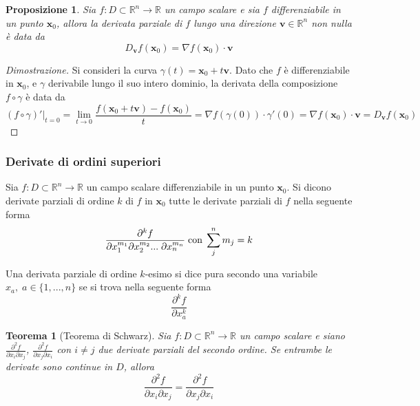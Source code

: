 \documentclass{article}
\newtheorem{theorem}{Teorema}
\newtheorem{proposition}{Proposizione}
\begin{document}
            \vspace{10pt}
            \begin{proposition}
                Sia $f: D \subset \mathbb{R}^{n} \rightarrow \mathbb{R}$ un campo scalare e sia $f$ differenziabile in un punto $\mathbf{x}_0$, allora la derivata parziale di $f$ lungo una direzione $\mathbf{v} \in \mathbb{R}^{n}$ non nulla è data da
                \[
                    D_{\mathbf{v}} f(\mathbf{x}_0) = \nabla f (\mathbf{x}_0) \cdot \mathbf{v}
                \]
            \end{proposition}
            \begin{proof}[Dimostrazione]
                Si consideri la curva $\gamma(t) = \mathbf{x}_0 + t \mathbf{v}$. Dato che $f$ è differenziabile in $\mathbf{x}_0$, e $\gamma$ derivabile lungo il suo intero dominio, la derivata della composizione $f \circ \gamma$ è data da
                \[
                    (f \circ \gamma)'|_{t = 0} = \lim_{t \rightarrow 0} \frac{f(\mathbf{x}_0 + t \mathbf{v}) - f(\mathbf{x}_0)}{t} = \nabla f(\gamma(0)) \cdot \gamma'(0) = \nabla f (\mathbf{x}_0) \cdot \mathbf{v} = D_{\mathbf{v}} f(\mathbf{x}_0)
                \]
            \end{proof}
        
        \subsubsection{Derivate di ordini superiori}
            Sia $f: D \subset \mathbb{R}^{n} \rightarrow \mathbb{R}$ un campo scalare differenziabile in un punto $\mathbf{x}_0$. Si dicono derivate parziali di ordine $k$ di $f$ in $\mathbf{x}_0$ tutte le derivate parziali di
            $f$ nella seguente forma
            \[
                \frac{\partial^{k} f}{\partial x_1^{m_1} \partial x_2^{m_2} ... \; \partial x_n^{m_n}} \; \textnormal{con} \; \sum_{j}^{n} m_{j} = k
            \]

            Una derivata parziale di ordine $k$-esimo si dice pura secondo una variabile $x_a, \; a \in \{1, ..., n\}$ se si trova nella seguente forma
            \[
                \frac{\partial^{k} f}{\partial x_{a}^{k}}
            \]

            \begin{theorem}[Teorema di Schwarz]
                Sia $f: D \subset \mathbb{R}^{n} \rightarrow \mathbb{R}$ un campo scalare e siano $\displaystyle \frac{\partial^{2} f}{\partial x_i \partial x_j}$, $\displaystyle \frac{\partial^{2} f}{\partial x_j \partial x_i}$ con 
                $i \neq j$ due derivate parziali del secondo ordine. Se entrambe le derivate sono continue in $D$, allora
                \[
                    \frac{\partial^{2} f}{\partial x_i \partial x_j} = \frac{\partial^{2} f}{\partial x_j \partial x_i}
                \]
            \end{theorem}
\end{document}
